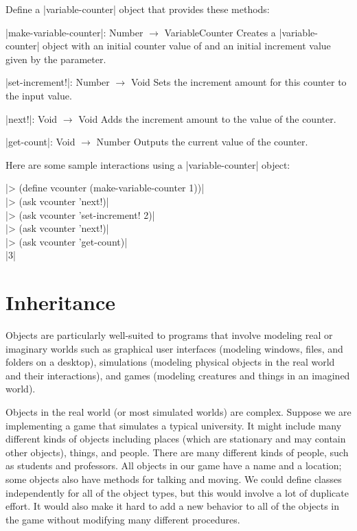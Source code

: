 \begin{schemeregion}
\beforesplitex
\begin{exercise}
\goldstar\label{exercise:varcounter}
Define a \scheme|variable-counter| object that provides these methods:
\begin{descriptionlist}
\item[\scheme|make-variable-counter|: Number $\rightarrow$ VariableCounter]\forcenl Creates a \scheme|variable-counter| object with an initial counter value of  and an initial increment value given by the parameter.
\item[\scheme|set-increment!|: Number $\rightarrow$ Void]\forcenl Sets the increment amount for this counter to the input value.
\item[\scheme|next!|: Void $\rightarrow$ Void] \forcenl Adds the increment amount to the value of the counter.
\item[\scheme|get-count|: Void $\rightarrow$ Number ] \forcenl Outputs the current value of the counter.
\end{descriptionlist}
Here are some sample interactions using a \scheme|variable-counter| object:
\begin{code}
\scheme|> (define vcounter (make-variable-counter 1))|\\
\scheme|> (ask vcounter 'next!)|\\
\scheme|> (ask vcounter 'set-increment! 2)|\\
\scheme|> (ask vcounter 'next!)|\\
\scheme|> (ask vcounter 'get-count)|\\
\schemeresult|3|
\end{code}
\solution{\LATER{}}
\end{exercise}
\aftersplitex

\section{Inheritance}\label{sec:inheritance}

Objects are particularly well-suited to programs that involve modeling real or imaginary worlds such as graphical user interfaces (modeling windows, files, and folders on a desktop), simulations (modeling physical objects in the real world and their interactions), and games (modeling creatures and things in an imagined world).  

Objects in the real world (or most simulated worlds) are complex.  Suppose we are implementing a game that simulates a typical university.  It might include many different kinds of objects including places (which are stationary and may contain other objects), things, and people.  There are many different kinds of people, such as students and professors.  All objects in our game have a name and a location; some objects also have methods for talking and moving.  We could define classes independently for all of the object types, but this would involve a lot of duplicate effort.  It would also make it hard to add a new behavior to all of the objects in the game without modifying many different procedures.  


\end{schemeregion}

